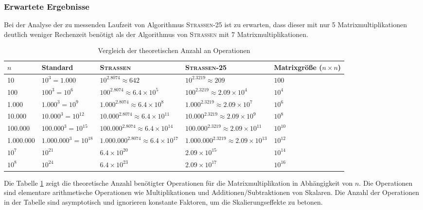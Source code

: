 \documentclass{report}
\numberwithin{equation}{section}
\begin{document}
\subsubsection{Erwartete Ergebnisse}
Bei der Analyse der zu messenden Laufzeit von Algorithmus \textsc{Strassen-25} ist zu erwarten, dass dieser mit nur 5 Matrixmultiplikationen deutlich weniger Rechenzeit benötigt als der Algorithmus von \textsc{Strassen} mit 7 Matrixmultiplikationen.
\begin{table}[h]
	\centering
	\caption{Vergleich der theoretischen Anzahl an Operationen}
	\label{tab:operations-comparison}
	\renewcommand{\arraystretch}{1.5} %
	\begin{tabular}{m{1.5cm}|m{3cm}|m{3cm}|m{3cm}|m{2cm}}
		\hline
		$n$ & Standard & \textsc{Strassen} & \textsc{Strassen-25} & Matrixgröße ($n \times n$) \\
		\hline\hline
		10 & $10^3 = 1.000$ & $10^{2.8074} \approx 642$ & $10^{2.3219} \approx 209$ & $100$ \\
		\hline
		100 & $100^3 = 10^6$ & $100^{2.8074} \approx 6.4 \times 10^5$ & $100^{2.3219} \approx 2.09 \times 10^4$ & $10^4$ \\
		\hline
		1.000 & $1.000^3 = 10^9$ & $1.000^{2.8074} \approx 6.4 \times 10^8$ & $1.000^{2.3219} \approx 2.09 \times 10^7$ & $10^6$ \\
		\hline
		10.000 & $10.000^3 = 10^{12}$ & $10.000^{2.8074} \approx 6.4 \times 10^{11}$ & $10.000^{2.3219} \approx 2.09 \times 10^{9}$ & $10^8$ \\
		\hline
		100.000 & $100.000^3 = 10^{15}$ & $100.000^{2.8074} \approx 6.4 \times 10^{14}$ & $100.000^{2.3219} \approx 2.09 \times 10^{11}$ & $10^{10}$ \\
		\hline
		1.000.000 & $1.000.000^3 = 10^{18}$ & $1.000.000^{2.8074} \approx 6.4 \times 10^{17}$ & $1.000.000^{2.3219} \approx 2.09 \times 10^{13}$ & $10^{12}$ \\
		\hline
		$10^7$ & $10^{21}$ & $6.4 \times 10^{20}$ & $2.09 \times 10^{15}$ & $10^{14}$ \\
		\hline
		$10^8$ & $10^{24}$ & $6.4 \times 10^{23}$ & $2.09 \times 10^{17}$ & $10^{16}$ \\
		\hline
	\end{tabular}
\end{table}
Die Tabelle \ref{tab:operations-comparison} zeigt die theoretische Anzahl benötigter Operationen für die Matrixmultiplikation in Abhängigkeit von $n$. Die Operationen sind elementare arithmetische Operationen wie Multiplikationen und Additionen/Subtraktionen von Skalaren. Die Anzahl der Operationen in der Tabelle sind asymptotisch und ignorieren konstante Faktoren, um die Skalierungseffekte zu betonen.
\end{document}
